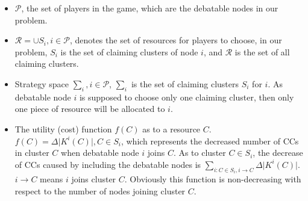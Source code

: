 \documentclass[10pt,journal,compsoc]{IEEEtran}
\theoremstyle{mytheoremstyle}
\theoremstyle{mytheoremstyle}
\theoremstyle{mytheoremstyle}
\begin{document}

\begin{itemize}
	\item $\mathcal{P}$, the set of players in the game, which are the debatable nodes in our problem.
	\item $\mathcal{R} = \cup S_i, i\in \mathcal{P}$, denotes the set of resources for players to choose, in our problem, $S_i$ is the set of claiming clusters of node $i$, and $\mathcal{R}$ is the set of all claiming clusters.
	\item Strategy space $\sum_i, i \in \mathcal{P}$, $\sum_i$ is the set of claiming clusters $S_i$ for $i$.
	As debatable node $i$ is supposed to choose only one claiming cluster, then only one piece of resource will be allocated to $i$.%
	
	
	\item %
	The utility (cost) function $f(C)$ as to a resource $C$. 
	$f(C) = \Delta\vert K^i(C)|, C\in S_i$, which represents the decreased number of CCs in cluster $C$ when debatable node $i$ joins $C$.
	As to cluster $C\in S_i$, the decrease of CCs caused by including the debatable nodes is $\sum_{i:C\in S_i, i\rightarrow C} \Delta\vert K^i(C) \vert$. 
$i\rightarrow C$ means $i$ joins cluster $C$.
Obviously this function is non-decreasing with respect to the number of nodes joining cluster $C$.
	

\end{itemize}
\end{document}
